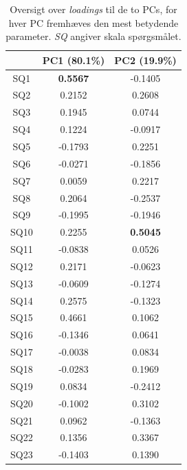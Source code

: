 \begin{table}[H]
\centering
\begin{tabular}{c|c|c}
    & PC1 (80.1\%)    & PC2 (19.9\%)    \\ \hline
SQ1  & \textbf{0.5567} & -0.1405         \\ \hline
SQ2  & 0.2152          & 0.2608          \\ \hline
SQ3  & 0.1945          & 0.0744          \\ \hline
SQ4  & 0.1224          & -0.0917         \\ \hline
SQ5  & -0.1793         & 0.2251          \\ \hline
SQ6  & -0.0271         & -0.1856         \\ \hline
SQ7  & 0.0059          & 0.2217          \\ \hline
SQ8  & 0.2064          & -0.2537         \\ \hline
SQ9  & -0.1995         & -0.1946         \\ \hline
SQ10 & 0.2255          & \textbf{0.5045} \\ \hline
SQ11 & -0.0838         & 0.0526          \\ \hline
SQ12 & 0.2171          & -0.0623         \\ \hline
SQ13 & -0.0609         & -0.1274         \\ \hline
SQ14 & 0.2575          & -0.1323         \\ \hline
SQ15 & 0.4661          & 0.1062          \\ \hline
SQ16 & -0.1346         & 0.0641          \\ \hline
SQ17 & -0.0038         & 0.0834          \\ \hline
SQ18 & -0.0283         & 0.1969          \\ \hline
SQ19 & 0.0834          & -0.2412         \\ \hline
SQ20 & -0.1002         & 0.3102          \\ \hline
SQ21 & 0.0962          & -0.1363         \\ \hline
SQ22 & 0.1356          & 0.3367          \\ \hline
SQ23 & -0.1403         & 0.1390         
\end{tabular}
\caption{Oversigt over \textit{loadings} til de to PCs, for hver PC fremhæves den mest betydende parameter. \textit{SQ} angiver skala spørgsmålet.}
\label{tab:LoadingsAfstand}
\end{table}
\noindent
%

